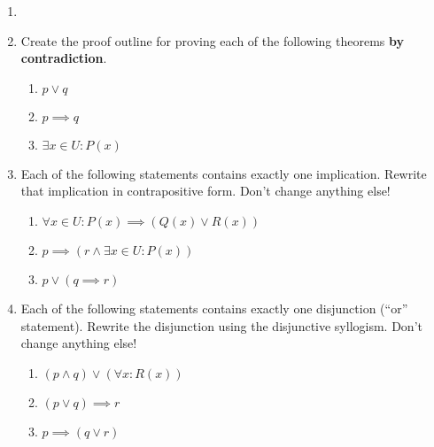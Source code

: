  \begin{xca}
 		\begin{enumerate}
 			\item[]
 				\item Create the proof outline for proving each of the following theorems \textbf{by contradiction}.
 				\begin{enumerate}
 						\item $p \vee q$
 						\item $p \implies q$
 						\item $\exists x \in U: P(x)$
 					\end{enumerate}
 				\item Each of the following statements contains exactly one implication.  Rewrite that implication in contrapositive form.  Don't change anything else!
 				
 				\begin{enumerate}
 						\item $\forall x\in U: P(x) \implies (Q(x) \vee R(x)) $
 						\item $ p \implies (r \wedge \exists x \in U: P(x))$
 						\item $p \vee (q \implies r)$
 					\end{enumerate}
 				
 				\item Each of the following statements contains exactly one disjunction (``or'' statement).  Rewrite the disjunction using the disjunctive syllogism.   Don't change anything else!
 				
 				\begin{enumerate}
 						\item $(p \wedge q) \vee (\forall x: R(x))$
 						\item $(p \vee q) \implies r$
 						\item $p \implies (q \vee r)$
 					\end{enumerate}
 			\end{enumerate}
 	\end{xca}
 
